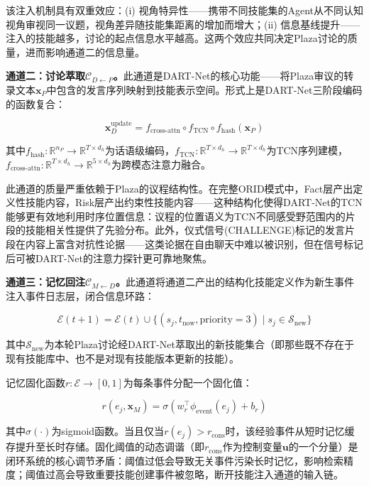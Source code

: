 \documentclass[twocolumn,10.5pt]{ctexart}
\def\R{\mathbb{R}}
\def\cE{\mathcal{E}}
\begin{document}
该注入机制具有双重效应：(i) 视角特异性——携带不同技能集的Agent从不同认知视角审视同一议题，视角差异随技能集距离的增加而增大；(ii) 信息基线提升——注入的技能越多，讨论的起点信息水平越高。这两个效应共同决定Plaza讨论的质量，进而影响通道二的信息量。

\textbf{通道二：讨论萃取$\mathcal{C}_{D \leftarrow P}$。}此通道是DART-Net的核心功能——将Plaza审议的转录文本$\mathbf{x}_P$中包含的发言序列映射到技能表示空间。形式上是DART-Net三阶段编码的函数复合：

\begin{equation}
\mathbf{x}_D^{\text{update}} = f_{\text{cross-attn}} \circ f_{\text{TCN}} \circ f_{\text{hash}}(\mathbf{x}_P)
\label{eq:extraction}
\end{equation}

其中$f_{\text{hash}}: \R^{n_P} \to \R^{T \times d_h}$为话语级编码，$f_{\text{TCN}}: \R^{T \times d_h} \to \R^{T \times d_h}$为TCN序列建模，$f_{\text{cross-attn}}: \R^{T \times d_h} \to \R^{5 \times d_h}$为跨模态注意力融合。

此通道的质量严重依赖于Plaza的议程结构性。在完整ORID模式中，Fact层产出定义性技能内容，Risk层产出约束性技能内容——这种结构化使得DART-Net的TCN能够更有效地利用时序位置信息：议程的位置语义为TCN不同感受野范围内的片段的技能相关性提供了先验分布。此外，仪式信号(CHALLENGE)标记的发言片段在内容上富含对抗性论据——这类论据在自由聊天中难以被识别，但在信号标记后可被DART-Net的注意力探针更可靠地聚焦。

\textbf{通道三：记忆回注$\mathcal{C}_{M \leftarrow D}$。}此通道将通道二产出的结构化技能定义作为新生事件注入事件日志层，闭合信息环路：

\begin{equation}
\cE(t+1) = \cE(t) \cup \{(s_j, t_{\text{now}}, \text{priority} = 3) \mid s_j \in \mathcal{S}_{\text{new}}\}
\label{eq:re_injection}
\end{equation}

其中$\mathcal{S}_{\text{new}}$为本轮Plaza讨论经DART-Net萃取出的新技能集合（即那些既不存在于现有技能库中、也不是对现有技能版本更新的技能）。

记忆固化函数$r: \cE \to [0,1]$为每条事件分配一个固化值：

\begin{equation}
r(e_j, \mathbf{x}_M) = \sigma\left(w_r^\top \phi_{\text{event}}(e_j) + b_r\right)
\label{eq:consolidation}
\end{equation}

其中$\sigma(\cdot)$为sigmoid函数。当且仅当$r(e_j) > r_{\text{cons}}$时，该经验事件从短时记忆缓存提升至长时存储。固化阈值的动态调谐（即$r_{\text{cons}}$作为控制变量$\mathbf{u}$的一个分量）是闭环系统的核心调节矛盾：阈值过低会导致无关事件污染长时记忆，影响检索精度；阈值过高会导致重要技能创建事件被忽略，断开技能注入通道的输入链。
\end{document}
